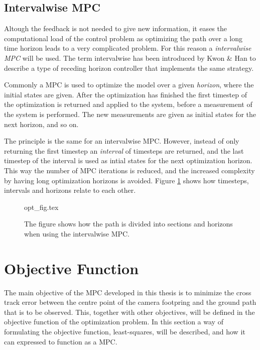 \subsection{Intervalwise MPC}

Altough the feedback is not needed to give new information, it eases the computational load of the control problem as optimizing the path over a long time horizon leads to a very complicated problem. For this reason a \textit{intervalwise MPC} will be used. The term intervalwise has been introduced by Kwon \& Han \cite{rhcKWON} to describe a type of receding horizon controller that implements the same strategy.

Commonly a MPC is used to optimize the model over a given \textit{horizon}, where the initial states are given. After the optimization has finished the first timestep of the optimization is returned and applied to the system, before a measurement of the system is performed. The new measurements are given as initial states for the next horizon, and so on.

The principle is the same for an intervalwise MPC. However, instead of only returning the first timestep an \textit{interval} of timesteps are returned, and the last timestep of the interval is used as intial states for the next optimization horizon. This way the number of MPC iterations is reduced, and the increased complexity by having long optimization horizons is avoided. Figure \ref{fig:opt_fig} shows how timesteps, intervals and horizons relate to each other.

\begin{figure}
	{opt_fig.tex}
	\caption{The figure shows how the path is divided into sections and horizons when using the intervalwise MPC.}
	\label{fig:opt_fig}
\end{figure}


\section{Objective Function}
\label{ch:objective_function}

The main objective of the MPC developed in this thesis is to minimize the cross track error between the centre point of the camera footpring and the ground path that is to be observed. This, together with other objectives, will be defined in the objective function of the optimization problem. In this section a way of formulating the objective function, least-squares, will be described, and how it can expressed to function as a MPC.


